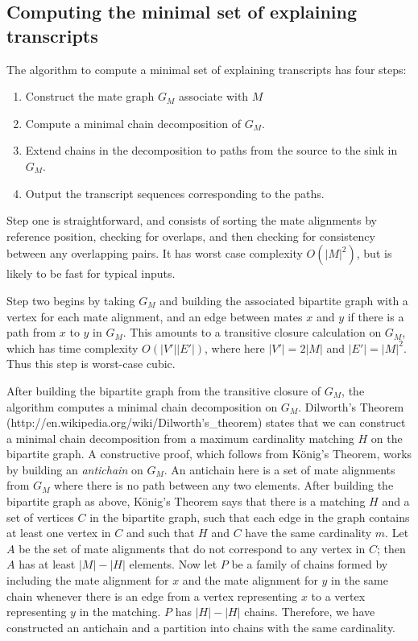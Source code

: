 \documentclass[twocolumn]{homework}
\theoremstyle{definition}
\begin{document}
\subsection{Computing the minimal set of explaining transcripts}
The algorithm to compute a minimal set of explaining transcripts has four steps:

\begin{enumerate}
    \item Construct the mate graph $G_M$ associate with $M$
    \item Compute a minimal chain decomposition of $G_M$.
    \item Extend chains in the decomposition to paths from the source to the sink in $G_M$.
    \item Output the transcript sequences corresponding to the paths.
\end{enumerate}

Step one is straightforward, and consists of sorting the mate alignments by
reference position, checking for overlaps, and then checking for consistency
between any overlapping pairs. It has worst case complexity $O(|M|^2)$, but is
likely to be fast for typical inputs.

Step two begins by taking $G_M$ and building the associated bipartite graph
with a vertex for each mate alignment, and an edge between mates $x$ and $y$
if there is a path from $x$ to $y$ in $G_M$. This amounts to a transitive
closure calculation on $G_M$, which has time complexity $O(|V'||E'|)$, where
here $|V'| = 2|M|$ and $|E'| = |M|^2$. Thus this step is worst-case cubic.

After building the bipartite graph from the transitive closure of $G_M$, the
algorithm computes a minimal chain decomposition on $G_M$. Dilworth's Theorem
(http://en.wikipedia.org/wiki/Dilworth's\_theorem) states that we can
construct a minimal chain decomposition from a maximum cardinality matching
$H$ on the bipartite graph. A constructive proof, which follows from K\"onig's
Theorem, works by building an \emph{antichain} on $G_M$. An antichain here is
a set of mate alignments from $G_M$ where there is no path between any two
elements. After building the bipartite graph as above, K\"onig's Theorem says
that there is a matching $H$ and a set of vertices $C$ in the bipartite graph,
such that each edge in the graph contains at least one vertex in $C$ and such
that $H$ and $C$ have the same cardinality $m$. Let $A$ be the set of mate
alignments that do not correspond to any vertex in $C$; then $A$ has at least
$|M| - |H|$ elements. Now let $P$ be a family of chains formed by including
the mate alignment for $x$ and the mate alignment for $y$ in the same chain
whenever there is an edge from a vertex representing $x$ to a vertex
representing $y$ in the matching. $P$ has $|H|-|H|$ chains. Therefore, we have
constructed an antichain and a partition into chains with the same
cardinality.
\end{document}
